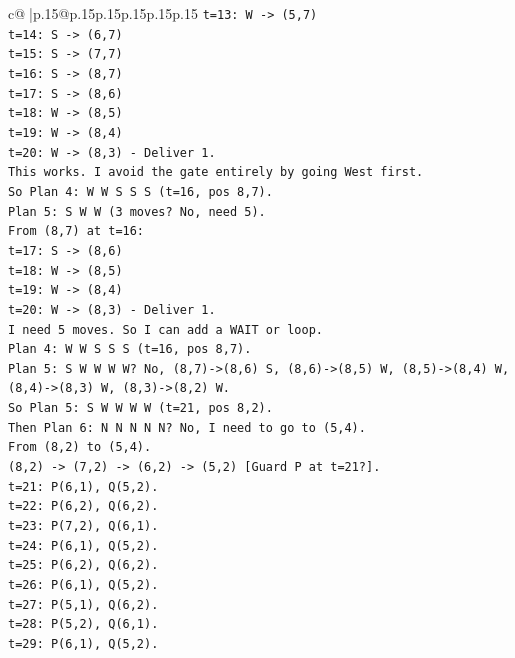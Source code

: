 \documentclass{article}
\begin{document}
{\begin{supertabular}{c@{$\;$}|p{.15\linewidth}@{}p{.15\linewidth}p{.15\linewidth}p{.15\linewidth}p{.15\linewidth}p{.15\linewidth}}
{{{\texttt{t=13: W {-}> (5,7)} \\
\texttt{t=14: S {-}> (6,7)} \\
\texttt{t=15: S {-}> (7,7)} \\
\texttt{t=16: S {-}> (8,7)} \\
\texttt{t=17: S {-}> (8,6)} \\
\texttt{t=18: W {-}> (8,5)} \\
\texttt{t=19: W {-}> (8,4)} \\
\texttt{t=20: W {-}> (8,3) {-} Deliver 1.} \\
\texttt{This works. I avoid the gate entirely by going West first.} \\
\texttt{So Plan 4: W W S S S (t=16, pos 8,7).} \\
\texttt{Plan 5: S W W (3 moves? No, need 5).} \\
\texttt{From (8,7) at t=16:} \\
\texttt{t=17: S {-}> (8,6)} \\
\texttt{t=18: W {-}> (8,5)} \\
\texttt{t=19: W {-}> (8,4)} \\
\texttt{t=20: W {-}> (8,3) {-} Deliver 1.} \\
\texttt{I need 5 moves. So I can add a WAIT or loop.} \\
\texttt{Plan 4: W W S S S (t=16, pos 8,7).} \\
\texttt{Plan 5: S W W W W? No, (8,7){-}>(8,6) S, (8,6){-}>(8,5) W, (8,5){-}>(8,4) W, (8,4){-}>(8,3) W, (8,3){-}>(8,2) W.} \\
\texttt{So Plan 5: S W W W W (t=21, pos 8,2).} \\
\texttt{Then Plan 6: N N N N N? No, I need to go to (5,4).} \\
\texttt{From (8,2) to (5,4).} \\
\texttt{(8,2) {-}> (7,2) {-}> (6,2) {-}> (5,2) {[}Guard P at t=21?{]}.} \\
\texttt{t=21: P(6,1), Q(5,2).} \\
\texttt{t=22: P(6,2), Q(6,2).} \\
\texttt{t=23: P(7,2), Q(6,1).} \\
\texttt{t=24: P(6,1), Q(5,2).} \\
\texttt{t=25: P(6,2), Q(6,2).} \\
\texttt{t=26: P(6,1), Q(5,2).} \\
\texttt{t=27: P(5,1), Q(6,2).} \\
\texttt{t=28: P(5,2), Q(6,1).} \\
\texttt{t=29: P(6,1), Q(5,2).} \\
}}}
\end{supertabular}}
\end{document}
